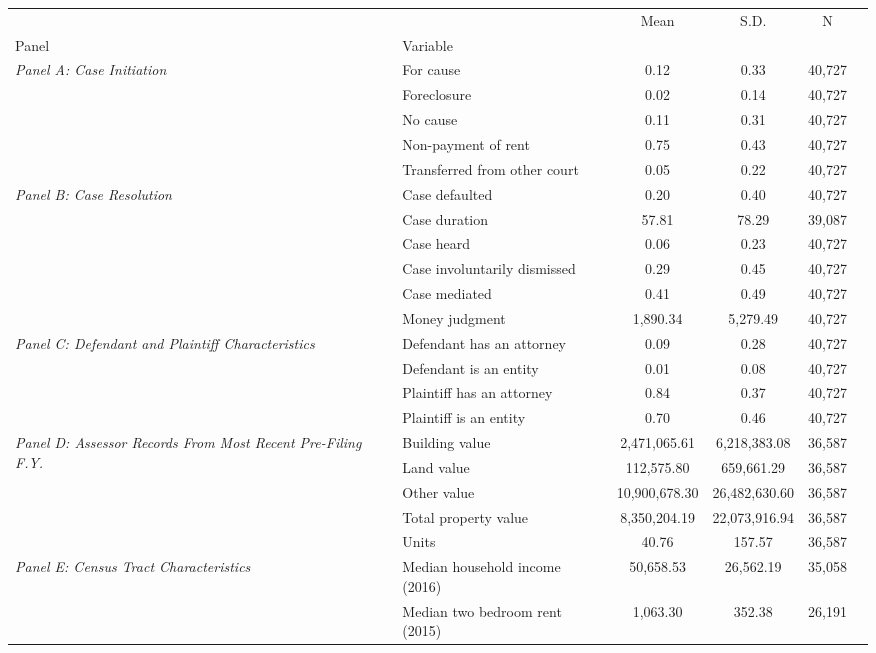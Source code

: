 \begin{tabular}{llcccc}
\toprule
 &  & Mean & S.D. & N \\
Panel & Variable &  &  &  \\
\midrule
\multirow[c]{5}{4cm}{\textit{Panel A: Case Initiation}} & For cause & 0.12 & 0.33 & 40,727 \\
 & Foreclosure & 0.02 & 0.14 & 40,727 \\
 & No cause & 0.11 & 0.31 & 40,727 \\
 & Non-payment of rent & 0.75 & 0.43 & 40,727 \\
 & Transferred from other court & 0.05 & 0.22 & 40,727 \\
\cline{1-5}
\multirow[c]{6}{4cm}{\textit{Panel B: Case Resolution}} & Case defaulted & 0.20 & 0.40 & 40,727 \\
 & Case duration & 57.81 & 78.29 & 39,087 \\
 & Case heard & 0.06 & 0.23 & 40,727 \\
 & Case involuntarily dismissed & 0.29 & 0.45 & 40,727 \\
 & Case mediated & 0.41 & 0.49 & 40,727 \\
 & Money judgment & 1,890.34 & 5,279.49 & 40,727 \\
\cline{1-5}
\multirow[c]{4}{4cm}{\textit{Panel C: Defendant and Plaintiff Characteristics}} & Defendant has an attorney & 0.09 & 0.28 & 40,727 \\
 & Defendant is an entity & 0.01 & 0.08 & 40,727 \\
 & Plaintiff has an attorney & 0.84 & 0.37 & 40,727 \\
 & Plaintiff is an entity & 0.70 & 0.46 & 40,727 \\
\cline{1-5}
\multirow[c]{5}{4cm}{\textit{Panel D: Assessor Records From Most Recent Pre-Filing F.Y.}} & Building value & 2,471,065.61 & 6,218,383.08 & 36,587 \\
 & Land value & 112,575.80 & 659,661.29 & 36,587 \\
 & Other value & 10,900,678.30 & 26,482,630.60 & 36,587 \\
 & Total property value & 8,350,204.19 & 22,073,916.94 & 36,587 \\
 & Units & 40.76 & 157.57 & 36,587 \\
\cline{1-5}
\multirow[c]{4}{4cm}{\textit{Panel E: Census Tract Characteristics}} & Median household income (2016) & 50,658.53 & 26,562.19 & 35,058 \\
 & Median two bedroom rent (2015) & 1,063.30 & 352.38 & 26,191 \\

\end{tabular}
